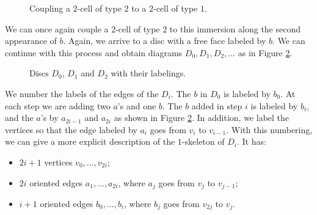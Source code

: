 \documentclass{amsart}
\theoremstyle{plain}
\theoremstyle{definition}
\theoremstyle{remark}
\numberwithin{equation}{section}
\begin{document}
\begin{figure}[ht]
\caption{Coupling a $2$-cell of type $2$ to a $2$-cell of type $1$.}
\label{figone}
\end{figure}

We can once again couple a $2$-cell of type $2$ to this immersion along the second appearance of $b$.
Again, we arrive to a disc with a free face labeled by $b$.
We can continue with this process and obtain diagrams $D_0,D_1,D_2,\ldots$ as in Figure \ref{figtwo}.

\begin{figure}[ht]
\caption{Discs $D_0$, $D_1$ and $D_2$ with their labelings.}
\label{figtwo}
\end{figure}

We number the labels of the edges of the $D_i$.
The $b$ in $D_0$ is labeled by $b_0$.
At each step we are adding two $a$'s and one $b$.
The $b$ added in step $i$ is labeled by $b_i$, and the $a$'s by $a_{2i-1}$ and $a_{2i}$ as shown in Figure \ref{figtwo}.
In addition, we label the vertices so that the edge labeled by $a_i$ goes from $v_i$ to $v_{i-1}$.
With this numbering, we can give a more explicit description of the $1$-skeleton of $D_i$. It has:
\begin{itemize}
    \item $2i+1$ vertices $v_0,\ldots,v_{2i}$;
    \item $2i$ oriented edges $a_1,\ldots,a_{2i}$, where $a_j$ goes from $v_j$ to $v_{j-1}$;
    \item $i+1$ oriented edges $b_0,\ldots,b_i$, where $b_j$ goes from $v_{2j}$ to $v_j$.
\end{itemize}
\end{document}
